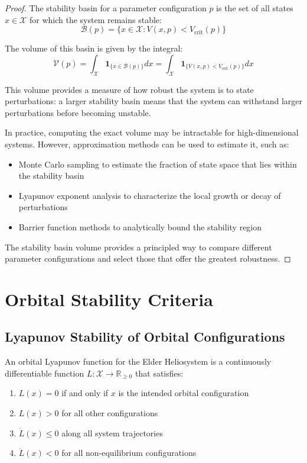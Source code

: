 \begin{proof}
The stability basin for a parameter configuration $p$ is the set of all states $x \in \mathcal{X}$ for which the system remains stable:
\begin{equation}
\mathcal{B}(p) = \{x \in \mathcal{X} : V(x, p) < V_{\text{crit}}(p)\}
\end{equation}

The volume of this basin is given by the integral:
\begin{equation}
\mathcal{V}(p) = \int_{\mathcal{X}} \mathbf{1}_{\{x \in \mathcal{B}(p)\}} dx = \int_{\mathcal{X}} \mathbf{1}_{\{V(x, p) < V_{\text{crit}}(p)\}} dx
\end{equation}

This volume provides a measure of how robust the system is to state perturbations: a larger stability basin means that the system can withstand larger perturbations before becoming unstable.

In practice, computing the exact volume may be intractable for high-dimensional systems. However, approximation methods can be used to estimate it, such as:
\begin{itemize}
    \item Monte Carlo sampling to estimate the fraction of state space that lies within the stability basin
    \item Lyapunov exponent analysis to characterize the local growth or decay of perturbations
    \item Barrier function methods to analytically bound the stability region
\end{itemize}

The stability basin volume provides a principled way to compare different parameter configurations and select those that offer the greatest robustness.
\end{proof}

\section{Orbital Stability Criteria}

\subsection{Lyapunov Stability of Orbital Configurations}

\begin{definition}
An orbital Lyapunov function for the Elder Heliosystem is a continuously differentiable function $L: \mathcal{X} \rightarrow \mathbb{R}_{\geq 0}$ that satisfies:
\begin{enumerate}
    \item $L(x) = 0$ if and only if $x$ is the intended orbital configuration
    \item $L(x) > 0$ for all other configurations
    \item $\dot{L}(x) \leq 0$ along all system trajectories
    \item $\dot{L}(x) < 0$ for all non-equilibrium configurations
\end{enumerate}
\end{definition}

